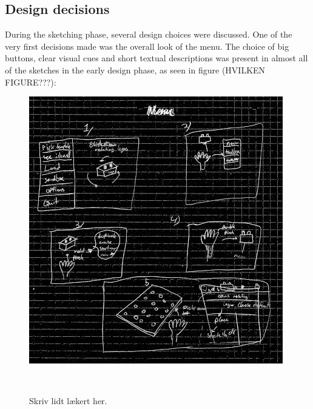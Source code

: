 \subsection{Design decisions}
During the sketching phase, several design choices were discussed. One of the very first decisions made was the overall look of the menu. The choice of big buttons, clear visual cues and short textual descriptions was present in almost all of the sketches in the early design phase, as seen in figure (HVILKEN FIGURE???):\\
\begin{figure}
\centering
  \includegraphics[width=0.9\columnwidth]{figures/Menu/menu2.png}
  \caption{Skriv lidt lækert her. }~\label{fig:genboard}
\end{figure}
